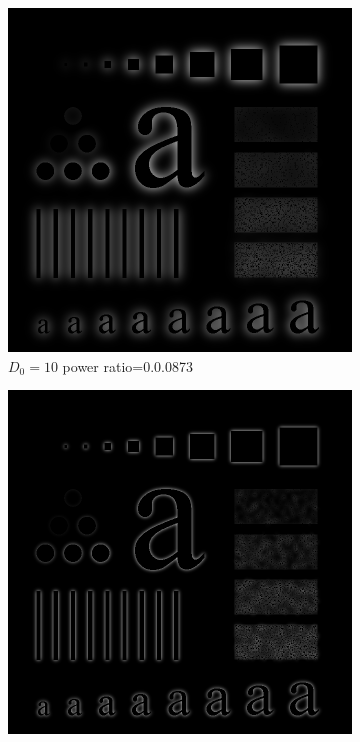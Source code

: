 \begin{figure}[h!]
	\centering
	\begin{subfigure}[b]{0.3\linewidth}
		\includegraphics[width=\linewidth]{myfigure/p3/GHPF_10.png}
		\caption{$D_0=10$ power ratio=0.0.0873}
		\label{fig:GHPF_10}
	\end{subfigure}
  	\begin{subfigure}[b]{0.3\linewidth}
		\includegraphics[width=\linewidth]{myfigure/p3/GHPF_30.png}

\end{subfigure}
\end{figure}
